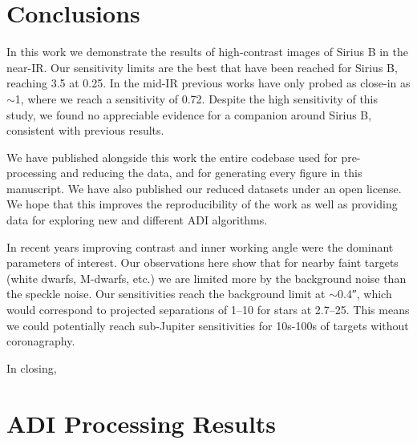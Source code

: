 \documentclass[twocolumn]{aastex631}
\begin{document}
\section{Conclusions} \label{sec:conclusion}

In this work we demonstrate the results of high-contrast images of Sirius B in the near-IR. Our sensitivity limits are the best that have been reached for Sirius B, reaching \qty{3.5}{\jupitermass} at \qty{0.25}{\au}. In the mid-IR previous works have only probed as close-in as $\sim$\qty{1}{\au}, where we reach a sensitivity of \qty{0.72}{\jupitermass}. Despite the high sensitivity of this study, we found no appreciable evidence for a companion around Sirius B, consistent with previous results.

We have published alongside this work the entire codebase used for pre-processing and reducing the data, and for generating every figure in this manuscript. We have also published our reduced datasets under an open license. We hope that this improves the reproducibility of the work as well as providing data for exploring new and different ADI algorithms.

In recent years improving contrast and inner working angle were the dominant parameters of interest. Our observations here show that for nearby faint targets (white dwarfs, M-dwarfs, etc.) we are limited more by the background noise than the speckle noise. Our sensitivities reach the background limit at $\sim$\ang{;;0.4}, which would correspond to projected separations of \qtyrange{1}{10}{\au} for stars at \qtyrange{2.7}{25}{\parsec}. This means we could potentially reach sub-Jupiter sensitivities for 10s-100s of targets without coronagraphy.

In closing, 


\begin{acknowledgments}

\end{acknowledgments}


{}


\appendix

\section{ADI Processing Results} \label{sec:adi-results}
\end{document}
